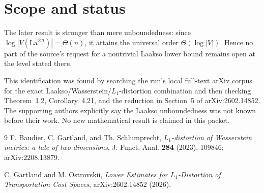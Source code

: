 \documentclass[11pt]{article}
\begin{document}
\section{Scope and status}

The later result is stronger than mere unboundedness: since
\(\log |V(\mathrm{La}^{\oslash n})|=\Theta(n)\), it attains the universal
order \( \Theta(\log |V|)\).  Hence no part of the source's request for a
nontrivial Laakso lower bound remains open at the level stated there.

This identification was found by searching the run's local full-text arXiv
corpus for the exact Laakso/Wasserstein/\(L_1\)-distortion combination and
then checking Theorem~1.2, Corollary~4.21, and the reduction in Section~5
of arXiv:2602.14852.  The supporting authors explicitly say the Laakso
unboundedness was not known before their work.  No new mathematical result
is claimed in this packet.

\begin{thebibliography}{9}
F. Baudier, C. Gartland, and Th. Schlumprecht,
\emph{\(L_1\)-distortion of Wasserstein metrics: a tale of two dimensions},
J. Funct. Anal. \textbf{284} (2023), 109846;
arXiv:2208.13879.

C. Gartland and M. Ostrovskii,
\emph{Lower Estimates for \(L_1\)-Distortion of Transportation Cost Spaces},
arXiv:2602.14852 (2026).
\end{thebibliography}
\end{document}
